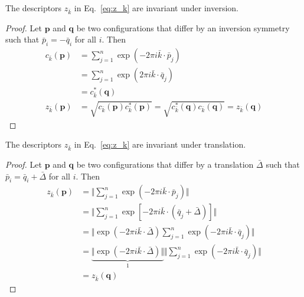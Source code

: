 \documentclass[default,iicol]{sn-jnl}%
\theoremstyle{thmstyleone}%
\theoremstyle{thmstyletwo}%
\theoremstyle{thmstylethree}%
\renewcommand{\vec}[1]{\bar{#1}}
\providecommand{\config}[1]{\mathbf{#1}}
\providecommand{\rmi}{i}
\begin{document}
\begin{appendices}
	The descriptors $z_{\vec{k}}$ in Eq.\ \ref{eq:z_k} are invariant under inversion.
	\begin{proof}
		Let $\config{p}$ and $\config{q}$ be two configurations that differ by an inversion symmetry such that $\vec{p}_i = -\vec{q}_i$ for all $i$. Then
		\begin{align*} 
		c_{\vec{k}}(\config{p}) &= 
		\sum_{j = 1}^{n} \exp{(-2\pi \rmi \vec{k} \cdot \vec{p}_j)} \\ \nonumber 
		&= \sum_{j = 1}^{n} \exp{(2\pi \rmi \vec{k} \cdot \vec{q}_j)} \\ \nonumber
		&= c_{\vec{k}}^\ast(\config{q}) \nonumber \\ 
		z_{\vec{k}}(\config{p}) &= \sqrt{c_{\vec{k}}(\config{p}) c_{\vec{k}}^\ast(\config{p})} = \sqrt{c_{\vec{k}}^\ast(\config{q}) c_{\vec{k}}(\config{q})} = z_{\vec{k}}(\config{q})
		\end{align*}
	\end{proof}
	
	
	
	
	
	
	
	
	
	
	
	
	
	
	
	
	
	The descriptors $z_{\vec{k}}$ in Eq.\ \ref{eq:z_k} are invariant under translation.
	\begin{proof}
		Let $\config{p}$ and $\config{q}$ be two configurations that differ by a translation $\vec{\Delta}$ such that $\vec{p}_i = \vec{q}_i + \vec{\Delta}$ for all $i$. Then
		\begin{align*} 
			z_{\vec{k}}(\config{p}) &= \bigg\Vert \sum_{j=1}^{n} \exp{(-2\pi \rmi \vec{k} \cdot \vec{p}_j)}\bigg\Vert \nonumber \\ 
			&= \bigg\Vert \sum_{j=1}^{n} \exp{[-2\pi \rmi \vec{k} \cdot (\vec{q}_j + \vec{\Delta})]}\bigg\Vert \\
			&= \bigg\Vert \exp{(-2\pi \rmi \vec{k} \cdot \vec{\Delta})} \sum_{j=1}^{n} \exp{(-2\pi \rmi \vec{k} \cdot \vec{q}_j)}\bigg\Vert \nonumber \\
			&= \underbrace{\bigg\Vert \exp{(-2\pi \rmi \vec{k} \cdot \vec{\Delta})} \bigg\Vert}_{1}
			\bigg\Vert \sum_{j=1}^{n} \exp{(-2\pi \rmi \vec{k} \cdot \vec{q}_j)}\bigg\Vert \\
			&=  z_{\vec{k}}(\config{q})
		\end{align*}
	\end{proof}


\end{appendices}
\end{document}
